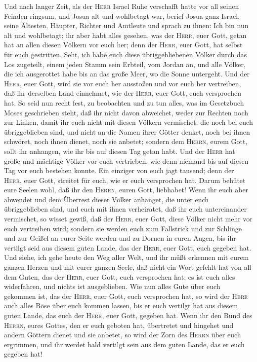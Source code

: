  Und nach langer Zeit, als der \textsc{Herr} Israel Ruhe
verschafft hatte vor all seinen Feinden ringsum, und Josua alt und
wohlbetagt war,  berief Josua ganz Israel, seine Ältesten,
Häupter, Richter und Amtleute und sprach zu ihnen: Ich bin nun alt und
wohlbetagt;  ihr aber habt alles gesehen, was der
\textsc{Herr}, euer Gott, getan hat an allen diesen Völkern vor euch
her; denn der \textsc{Herr}, euer Gott, hat selbst für euch gestritten.
 Seht, ich habe euch diese übriggebliebenen Völker durch
das Los zugeteilt, einem jeden Stamm sein Erbteil, vom Jordan an, und
alle Völker, die ich ausgerottet habe bis an das große Meer, wo die
Sonne untergeht.  Und der \textsc{Herr}, euer Gott, wird
sie vor euch her ausstoßen und vor euch her vertreiben, daß ihr
derselben Land einnehmet, wie der \textsc{Herr}, euer Gott, euch
versprochen hat.  So seid nun recht fest, zu beobachten
und zu tun alles, was im Gesetzbuch Moses geschrieben steht, daß ihr
nicht davon abweichet, weder zur Rechten noch zur Linken, 
damit ihr euch nicht mit diesen Völkern vermischet, die noch bei euch
übriggeblieben sind, und nicht an die Namen ihrer Götter denket, noch
bei ihnen schwöret, noch ihnen dienet, noch sie anbetet; 
sondern dem \textsc{Herrn}, eurem Gott, sollt ihr anhangen, wie ihr bis
auf diesen Tag getan habt.  Und der \textsc{Herr} hat
große und mächtige Völker vor euch vertrieben, wie denn niemand bis auf
diesen Tag vor euch bestehen konnte.  Ein einziger von
euch jagt tausend; denn der \textsc{Herr}, euer Gott, streitet für euch,
wie er euch versprochen hat.  Darum behütet eure Seelen
wohl, daß ihr den \textsc{Herrn}, euren Gott, liebhabet! 
Wenn ihr euch aber abwendet und dem Überrest dieser Völker anhanget, die
unter euch übriggeblieben sind, und euch mit ihnen verheiratet, daß ihr
euch untereinander vermischet, so wisset gewiß,  daß der
\textsc{Herr}, euer Gott, diese Völker nicht mehr vor euch vertreiben
wird; sondern sie werden euch zum Fallstrick und zur Schlinge und zur
Geißel an eurer Seite werden und zu Dornen in euren Augen, bis ihr
vertilgt seid aus diesem guten Lande, das der \textsc{Herr}, euer Gott,
euch gegeben hat.  Und siehe, ich gehe heute den Weg
aller Welt, und ihr müßt erkennen mit eurem ganzen Herzen und mit eurer
ganzen Seele, daß nicht ein Wort gefehlt hat von all dem Guten, das der
\textsc{Herr}, euer Gott, euch versprochen hat; es ist euch alles
widerfahren, und nichts ist ausgeblieben.  Wie nun alles
Gute über euch gekommen ist, das der \textsc{Herr}, euer Gott, euch
versprochen hat, so wird der \textsc{Herr} auch alles Böse über euch
kommen lassen, bis er euch vertilgt hat aus diesem guten Lande, das euch
der \textsc{Herr}, euer Gott, gegeben hat.  Wenn ihr den
Bund des \textsc{Herrn}, eures Gottes, den er euch geboten hat,
übertretet und hingehet und andern Göttern dienet und sie anbetet, so
wird der Zorn des \textsc{Herrn} über euch ergrimmen, und ihr werdet
bald vertilgt sein aus dem guten Lande, das er euch gegeben hat!

